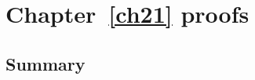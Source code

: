 \chapter{Chapter~\ref{ch21} proofs}

\newpage
\section{Summary}\label{ch21.ps.summary}
\lpscriptsummary

